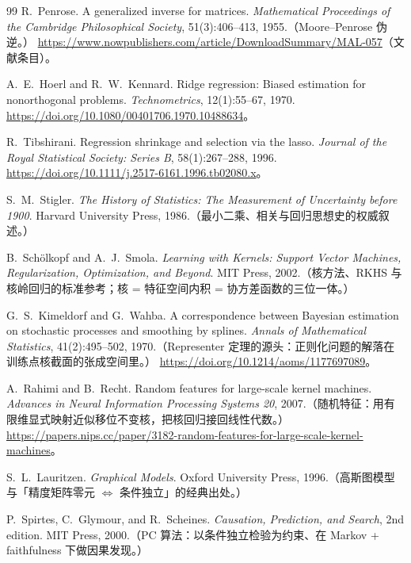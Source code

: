 \documentclass[11pt, a4paper]{ctexart}
\theoremstyle{plain}
\theoremstyle{definition}
\theoremstyle{remark}
\begin{document}
\begin{thebibliography}{99}
R.~Penrose.
\newblock A generalized inverse for matrices.
\newblock \emph{Mathematical Proceedings of the Cambridge Philosophical Society}, 51(3):406--413, 1955.（Moore--Penrose 伪逆。）
\newblock \url{https://www.nowpublishers.com/article/DownloadSummary/MAL-057}（文献条目）。

A.~E.~Hoerl and R.~W.~Kennard.
\newblock Ridge regression: Biased estimation for nonorthogonal problems.
\newblock \emph{Technometrics}, 12(1):55--67, 1970.
\newblock \url{https://doi.org/10.1080/00401706.1970.10488634}。

R.~Tibshirani.
\newblock Regression shrinkage and selection via the lasso.
\newblock \emph{Journal of the Royal Statistical Society: Series B}, 58(1):267--288, 1996.
\newblock \url{https://doi.org/10.1111/j.2517-6161.1996.tb02080.x}。

S.~M.~Stigler.
\newblock \emph{The History of Statistics: The Measurement of Uncertainty before 1900}.
\newblock Harvard University Press, 1986.（最小二乘、相关与回归思想史的权威叙述。）

B.~Sch\"olkopf and A.~J.~Smola.
\newblock \emph{Learning with Kernels: Support Vector Machines, Regularization, Optimization, and Beyond}.
\newblock MIT Press, 2002.（核方法、RKHS 与核岭回归的标准参考；核 = 特征空间内积 = 协方差函数的三位一体。）

G.~S.~Kimeldorf and G.~Wahba.
\newblock A correspondence between Bayesian estimation on stochastic processes and smoothing by splines.
\newblock \emph{Annals of Mathematical Statistics}, 41(2):495--502, 1970.（Representer 定理的源头：正则化问题的解落在训练点核截面的张成空间里。）
\newblock \url{https://doi.org/10.1214/aoms/1177697089}。

A.~Rahimi and B.~Recht.
\newblock Random features for large-scale kernel machines.
\newblock \emph{Advances in Neural Information Processing Systems 20}, 2007.（随机特征：用有限维显式映射近似移位不变核，把核回归接回线性代数。）
\newblock \url{https://papers.nips.cc/paper/3182-random-features-for-large-scale-kernel-machines}。

S.~L.~Lauritzen.
\newblock \emph{Graphical Models}.
\newblock Oxford University Press, 1996.（高斯图模型与「精度矩阵零元 $\Leftrightarrow$ 条件独立」的经典出处。）

P.~Spirtes, C.~Glymour, and R.~Scheines.
\newblock \emph{Causation, Prediction, and Search}, 2nd edition.
\newblock MIT Press, 2000.（PC 算法：以条件独立检验为约束、在 Markov + faithfulness 下做因果发现。）


\end{thebibliography}
\end{document}
